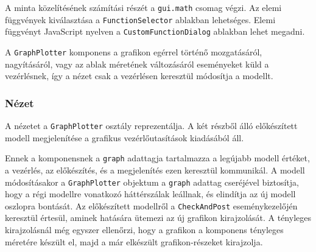 A minta közelítésének számítási részét a \texttt{gui.math} csomag végzi.
Az elemi függvények kiválasztása a \texttt{FunctionSelector} ablakban lehetséges.
Elemi függvényt JavaScript nyelven a \texttt{CustomFunctionDialog} ablakban lehet megadni.

A \texttt{GraphPlotter} komponens a grafikon egérrel történő mozgatásáról, nagyításáról, vagy az ablak méretének változásáról eseményeket küld a vezérlésnek, így a nézet csak a vezérlésen keresztül módosítja a modellt.

\subsubsection{Nézet}

A nézetet a \texttt{GraphPlotter} osztály reprezentálja.
A két részből álló előkészített modell megjelenítése a grafikus vezérlőutasítások kiadásából áll.

Ennek a komponensnek a \texttt{graph} adattagja tartalmazza a legújabb modell értéket, a vezérlés, az előkészítés, és a megjelenítés ezen keresztül kommunikál.
A modell módosításakor a \texttt{GraphPlotter} objektum a \texttt{graph} adattag cseréjével biztosítja, hogy a régi modellre vonatkozó háttérszálak leállnak, és elindítja az új modell oszlopra bontását.
Az előkészített modellről a \texttt{CheckAndPost} eseménykezelőjén keresztül értesül, aminek hatására ütemezi az új grafikon kirajzolását.
A tényleges kirajzolásnál még egyszer ellenőrzi, hogy a grafikon a komponens tényleges méretére készült el, majd a már elkészült grafikon-részeket kirajzolja.

